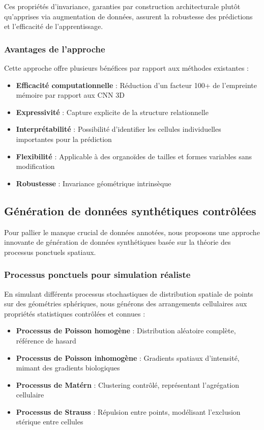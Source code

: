 Ces propriétés d'invariance, garanties par construction architecturale plutôt qu'apprises via augmentation de données, assurent la robustesse des prédictions et l'efficacité de l'apprentissage.

\subsubsection{Avantages de l'approche}

Cette approche offre plusieurs bénéfices par rapport aux méthodes existantes :
\begin{itemize}
    \item \textbf{Efficacité computationnelle} : Réduction d'un facteur 100+ de l'empreinte mémoire par rapport aux CNN 3D
    \item \textbf{Expressivité} : Capture explicite de la structure relationnelle
    \item \textbf{Interprétabilité} : Possibilité d'identifier les cellules individuelles importantes pour la prédiction
    \item \textbf{Flexibilité} : Applicable à des organoïdes de tailles et formes variables sans modification
    \item \textbf{Robustesse} : Invariance géométrique intrinsèque
\end{itemize}

\subsection{Génération de données synthétiques contrôlées}

Pour pallier le manque crucial de données annotées, nous proposons une approche innovante de génération de données synthétiques basée sur la théorie des processus ponctuels spatiaux.

\subsubsection{Processus ponctuels pour simulation réaliste}

En simulant différents processus stochastiques de distribution spatiale de points~\cite{Illian2008,Diggle2013} sur des géométries sphériques, nous générons des arrangements cellulaires aux propriétés statistiques contrôlées et connues :

\begin{itemize}
    \item \textbf{Processus de Poisson homogène} : Distribution aléatoire complète, référence de hasard
    \item \textbf{Processus de Poisson inhomogène} : Gradients spatiaux d'intensité, mimant des gradients biologiques
    \item \textbf{Processus de Matérn} : Clustering contrôlé, représentant l'agrégation cellulaire
    \item \textbf{Processus de Strauss} : Répulsion entre points, modélisant l'exclusion stérique entre cellules
\end{itemize}

